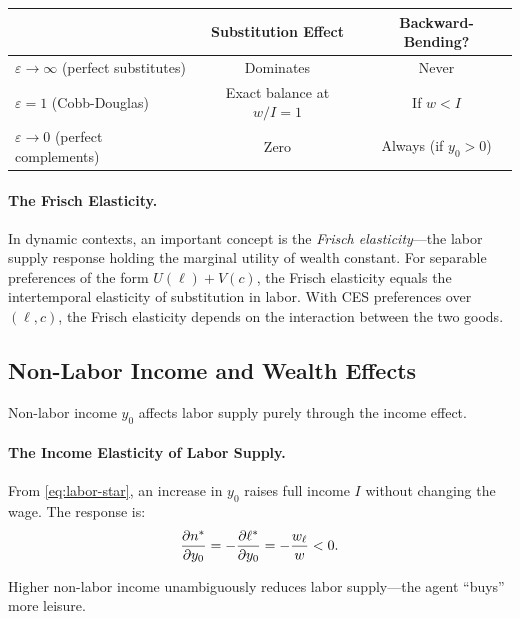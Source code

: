 \begin{center}
\renewcommand{\arraystretch}{1.4}
\begin{tabular}{@{}lcc@{}}
\toprule
& \textbf{Substitution Effect} & \textbf{Backward-Bending?} \\
\midrule
$\varepsilon \to \infty$ (perfect substitutes) & Dominates & Never \\
$\varepsilon = 1$ (Cobb-Douglas) & Exact balance at $w/I = 1$ & If $w < I$ \\
$\varepsilon \to 0$ (perfect complements) & Zero & Always (if $y_0 > 0$) \\
\bottomrule
\end{tabular}
\end{center}

\paragraph{The Frisch Elasticity.}
In dynamic contexts, an important concept is the \emph{Frisch elasticity}---the labor supply response holding the marginal utility of wealth constant. For separable preferences of the form $U(\ell) + V(c)$, the Frisch elasticity equals the intertemporal elasticity of substitution in labor. With CES preferences over $(\ell, c)$, the Frisch elasticity depends on the interaction between the two goods.

\subsection{Non-Labor Income and Wealth Effects}
\label{subsec:labor-nonlabor}

Non-labor income $y_0$ affects labor supply purely through the income effect.

\paragraph{The Income Elasticity of Labor Supply.}
From \eqref{eq:labor-star}, an increase in $y_0$ raises full income $I$ without changing the wage. The response is:
\begin{equation}
\frac{\partial n^*}{\partial y_0} = -\frac{\partial \ell^*}{\partial y_0} = -\frac{w_\ell}{w} < 0.
\label{eq:labor-income-effect}
\end{equation}

Higher non-labor income unambiguously reduces labor supply---the agent ``buys'' more leisure.

